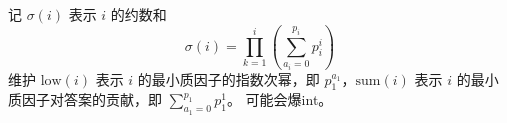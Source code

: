 记 $\sigma(i)$ 表示 $i$ 的约数和
$$\sigma(i)=\prod_{k=1}^i\left(\sum_{a_i=0}^{p_i}p_i^i\right)$$
维护 $\text{low}(i)$ 表示 $i$ 的最小质因子的指数次幂，即 $p^{a_1}_1$，$\text{sum}(i)$ 表示 $i$ 的最小质因子对答案的贡献，即 $\sum_{a_1=0}^{p_1}p_1^1$。
可能会爆int。